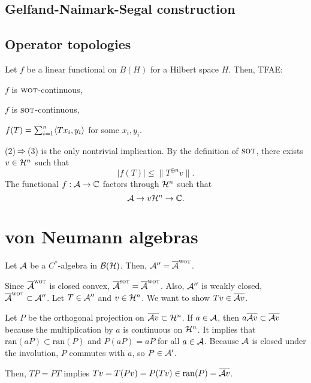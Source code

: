 \documentclass{../note}
\newcommand{\wot}{{\text{\sc wot}}}
\newcommand{\sot}{{\text{\sc sot}}}
\newcommand{\ran}{\mathrm{ran}}
\begin{document}
\subsection{Gelfand-Naimark-Segal construction}


\subsection{Operator topologies}

\begin{thm}
Let $f$ be a linear functional on $B(H)$ for a Hilbert space $H$.
Then, TFAE:
\begin{parts}
\item $f$ is $\wot$-continuous,
\item $f$ is $\sot$-continuous,
\item $f(T)=\sum_{i=1}^n\langle Tx_i,y_i\rangle$ for some $x_i,y_i$.
\end{parts}
\end{thm}
\begin{pf}
(2)$\impl$(3) is the only nontrivial implication.
By the definition of $\sot$, there exists $v\in \mathcal{H}^n$ such that
\[|f(T)|\le\|T^{\oplus n}v\|.\]
The functional $f:\mathcal{A}\to\mathbb{C}$ factors through $\mathcal{H}^n$ such that
\[\mathcal{A}\to{v}\mathcal{H}^n\to\mathbb{C}.\]
\end{pf}




\section{von Neumann algebras}

\begin{thm}
Let $\mathcal{A}$ be a $C^*$-algebra in $\mathcal{B}(\mathcal{H})$.
Then, $\cA''=\cl\cA^\wot$.
\end{thm}
\begin{pf}
Since $\cl\cA^\wot$ is closed convex, $\cl\cA^\sot=\cl\cA^\wot$.
Also, $\mathcal{A}''$ is weakly closed, $\cl\cA^\wot\subset\cA''$.
Let $T\in\mathcal{A}''$ and $v\in\mathcal{H}^n$.
We want to show $Tv\in\overline{\mathcal{A} v}$.

Let $P$ be the orthogonal projection on $\overline{\mathcal{A} v}\subset\mathcal{H}^n$.
If $a\in\mathcal{A}$, then $a\overline{\mathcal{A} v}\subset\overline{\mathcal{A} v}$ because the multiplication by $a$ is continuous on $\mathcal{H}^n$.
It implies that $\ran(aP)\subset\ran(P)$ and $P(aP)=aP$ for all $a\in\mathcal{A}$.
Because $\mathcal{A}$ is closed under the involution, $P$ commutes with $a$, so $P\in\mathcal{A}'$.

Then, $TP=PT$ implies $Tv=T(Pv)=P(Tv)\in\ran(P)=\cl{\cA v}$.

\end{pf}
\end{document}
